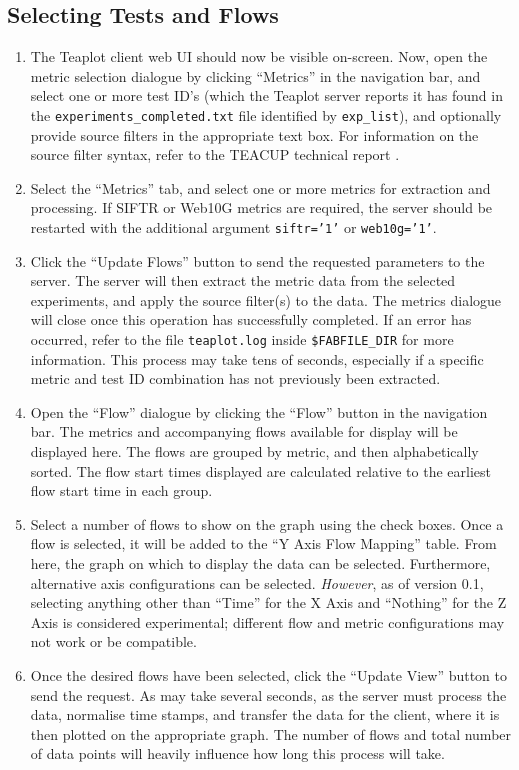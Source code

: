 \documentclass[a4paper,twocolumn,english,11pt, a4paper, conference]{IEEEtran}
\begin{document}
	\subsection{Selecting Tests and Flows}
	\begin{enumerate}
	\item The Teaplot client web UI should  now be visible on-screen. Now, open the metric selection dialogue by clicking ``Metrics'' in the navigation bar, and select one or more test ID's (which the Teaplot server reports it has found in the \texttt{experiments\_completed.txt} file identified by \texttt{exp\_list}), and optionally provide source filters in the appropriate text box. For information on the source filter syntax, refer to the TEACUP technical report \cite{CAIA-TR-150529B}.
	\item Select the ``Metrics'' tab, and select one or more metrics for extraction and processing. If SIFTR or Web10G metrics are required, the server should be restarted with the additional argument \texttt{siftr='1'} or \texttt{web10g='1'}.
	\item Click the ``Update Flows'' button to send the requested parameters to the server. The server will then extract the metric data from the selected experiments, and apply the source filter(s) to the data. The metrics dialogue will close once this operation has successfully completed. If an error has occurred, refer to the file \texttt{teaplot.log} inside \texttt{\$FABFILE\_DIR} for more information. This process may take tens of seconds, especially if a specific metric and test ID combination has not previously been extracted.
	\item Open the ``Flow'' dialogue by clicking the ``Flow'' button in the navigation bar. The metrics and accompanying flows \footnotemark[1] available for display will be displayed here. The flows are grouped by metric, and then alphabetically sorted. The flow start times displayed are calculated relative to the earliest flow start time in each group. \footnotemark[2]
	\item Select a number of flows to show on the graph using the check boxes. Once a flow is selected, it will be added to the ``Y Axis Flow Mapping'' table. From here, the graph on which to display the data can be selected. Furthermore, alternative axis configurations can be selected. \emph{However}, as of version 0.1, selecting anything other than ``Time'' for the X Axis and ``Nothing'' for the Z Axis is considered experimental; different flow and metric configurations may not work or be compatible.
	\item Once the desired flows have been selected, click the ``Update View'' button to send the request. As may take several seconds, as the server must process the data, normalise time stamps, and transfer the data for the client, where it is then plotted on the appropriate graph. The number of flows and total number of data points will heavily influence how long this process will take. \footnotemark[3]
\end{enumerate}
\end{document}
